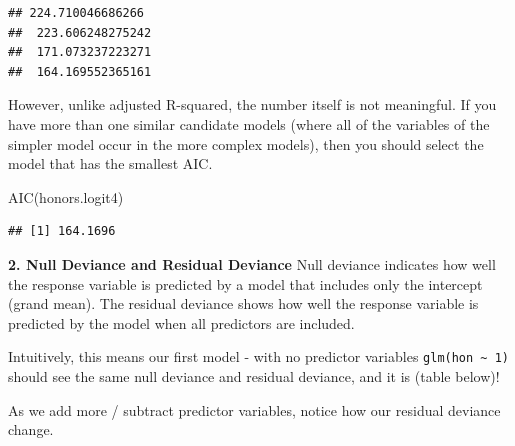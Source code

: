 \documentclass[
]{article}
\newenvironment{Shaded}{\begin{snugshade}}{\end{snugshade}}
\newcommand{\FunctionTok}[1]{\textcolor[rgb]{0.00,0.00,0.00}{#1}}
\newcommand{\NormalTok}[1]{#1}
\newcommand{\OtherTok}[1]{\textcolor[rgb]{0.56,0.35,0.01}{#1}}
\newcommand{\SpecialCharTok}[1]{\textcolor[rgb]{0.00,0.00,0.00}{#1}}
\newcommand{\StringTok}[1]{\textcolor[rgb]{0.31,0.60,0.02}{#1}}
\begin{document}
\begin{verbatim}
## 224.710046686266 
##  223.606248275242 
##  171.073237223271 
##  164.169552365161
\end{verbatim}

However, unlike adjusted R-squared, the number itself is not meaningful.
If you have more than one similar candidate models (where all of the
variables of the simpler model occur in the more complex models), then
you should select the model that has the smallest AIC.

\begin{Shaded}
\begin{Highlighting}[]
\FunctionTok{AIC}\NormalTok{(honors.logit4)}
\end{Highlighting}
\end{Shaded}

\begin{verbatim}
## [1] 164.1696
\end{verbatim}

\textbf{2. Null Deviance and Residual Deviance} Null deviance indicates
how well the response variable is predicted by a model that includes
only the intercept (grand mean). The residual deviance shows how well
the response variable is predicted by the model when all predictors are
included.

Intuitively, this means our first model - with no predictor variables
\texttt{glm(hon\ \textasciitilde{}\ 1)} should see the same null
deviance and residual deviance, and it is (table below)!

As we add more / subtract predictor variables, notice how our residual
deviance change.

\begin{Shaded}
\end{Shaded}
\end{document}
